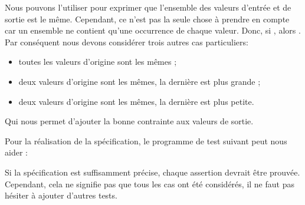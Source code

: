 Nous pouvons l'utiliser pour exprimer que l'ensemble des valeurs d'entrée et
de sortie est le même. Cependant, ce n'est pas la seule chose à prendre en
compte car un ensemble ne contient qu'une occurrence de chaque valeur. Donc,
si , alors .
Par conséquent nous devons considérer trois autres cas particuliers:


\begin{itemize}
\item toutes les valeurs d'origine sont les mêmes ;
\item deux valeurs d'origine sont les mêmes, la dernière est plus grande ;
\item deux valeurs d'origine sont les mêmes, la dernière est plus petite.
\end{itemize}


Qui nous permet d'ajouter la bonne contrainte aux valeurs de sortie.


Pour la réalisation de la spécification, le programme de test suivant peut
nous aider :




Si la spécification est suffisamment précise, chaque assertion devrait être
prouvée. Cependant, cela ne signifie pas que tous les cas ont été considérés,
il ne faut pas hésiter à ajouter d'autres tests.
